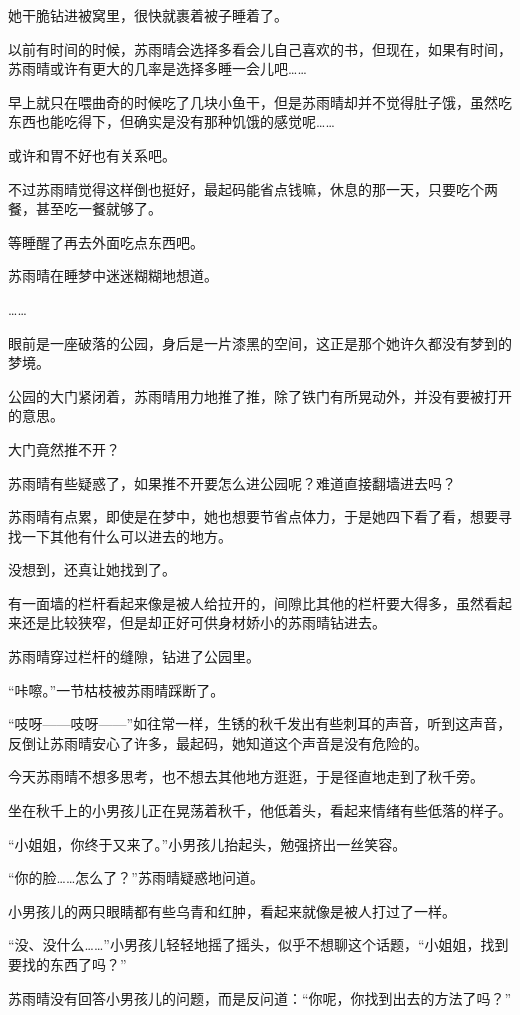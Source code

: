 她干脆钻进被窝里，很快就裹着被子睡着了。

以前有时间的时候，苏雨晴会选择多看会儿自己喜欢的书，但现在，如果有时间，苏雨晴或许有更大的几率是选择多睡一会儿吧……

早上就只在喂曲奇的时候吃了几块小鱼干，但是苏雨晴却并不觉得肚子饿，虽然吃东西也能吃得下，但确实是没有那种饥饿的感觉呢……

或许和胃不好也有关系吧。

不过苏雨晴觉得这样倒也挺好，最起码能省点钱嘛，休息的那一天，只要吃个两餐，甚至吃一餐就够了。

等睡醒了再去外面吃点东西吧。

苏雨晴在睡梦中迷迷糊糊地想道。

……

眼前是一座破落的公园，身后是一片漆黑的空间，这正是那个她许久都没有梦到的梦境。

公园的大门紧闭着，苏雨晴用力地推了推，除了铁门有所晃动外，并没有要被打开的意思。

大门竟然推不开？

苏雨晴有些疑惑了，如果推不开要怎么进公园呢？难道直接翻墙进去吗？

苏雨晴有点累，即使是在梦中，她也想要节省点体力，于是她四下看了看，想要寻找一下其他有什么可以进去的地方。

没想到，还真让她找到了。

有一面墙的栏杆看起来像是被人给拉开的，间隙比其他的栏杆要大得多，虽然看起来还是比较狭窄，但是却正好可供身材娇小的苏雨晴钻进去。

苏雨晴穿过栏杆的缝隙，钻进了公园里。

“咔嚓。”一节枯枝被苏雨晴踩断了。

“吱呀——吱呀——”如往常一样，生锈的秋千发出有些刺耳的声音，听到这声音，反倒让苏雨晴安心了许多，最起码，她知道这个声音是没有危险的。

今天苏雨晴不想多思考，也不想去其他地方逛逛，于是径直地走到了秋千旁。

坐在秋千上的小男孩儿正在晃荡着秋千，他低着头，看起来情绪有些低落的样子。

“小姐姐，你终于又来了。”小男孩儿抬起头，勉强挤出一丝笑容。

“你的脸……怎么了？”苏雨晴疑惑地问道。

小男孩儿的两只眼睛都有些乌青和红肿，看起来就像是被人打过了一样。

“没、没什么……”小男孩儿轻轻地摇了摇头，似乎不想聊这个话题，“小姐姐，找到要找的东西了吗？”

苏雨晴没有回答小男孩儿的问题，而是反问道：“你呢，你找到出去的方法了吗？”

